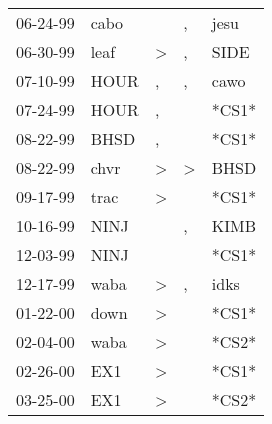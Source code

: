 \begin{supertabular}{p{0.07\textwidth}p{0.06\textwidth}p{0.02\textwidth}p{0.02\textwidth}p{0.06\textwidth}}
          06-24-99\textsuperscript{} &           cabo\textsuperscript{} &                  &                , &           jesu\textsuperscript{} \\
          06-30-99\textsuperscript{} &           leaf\textsuperscript{} &     \textgreater &                , &           SIDE\textsuperscript{} \\
          07-10-99\textsuperscript{} &           HOUR\textsuperscript{} &                , &                , &           cawo\textsuperscript{} \\
          07-24-99\textsuperscript{} &           HOUR\textsuperscript{} &                , &                  &                            *CS1* \\
          08-22-99\textsuperscript{} &           BHSD\textsuperscript{} &                , &                  &                            *CS1* \\
          08-22-99\textsuperscript{} &           chvr\textsuperscript{} &     \textgreater &     \textgreater &           BHSD\textsuperscript{} \\
          09-17-99\textsuperscript{} &           trac\textsuperscript{} &     \textgreater &                  &                            *CS1* \\
          10-16-99\textsuperscript{} &           NINJ\textsuperscript{} &                  &                , &           KIMB\textsuperscript{} \\
          12-03-99\textsuperscript{} &           NINJ\textsuperscript{} &                  &                  &                            *CS1* \\
          12-17-99\textsuperscript{} &           waba\textsuperscript{} &     \textgreater &                , &           idks\textsuperscript{} \\
          01-22-00\textsuperscript{} &           down\textsuperscript{} &     \textgreater &                  &                            *CS1* \\
          02-04-00\textsuperscript{} &           waba\textsuperscript{} &     \textgreater &                  &                            *CS2* \\
          02-26-00\textsuperscript{} &            EX1\textsuperscript{} &     \textgreater &                  &                            *CS1* \\
          03-25-00\textsuperscript{} &            EX1\textsuperscript{} &     \textgreater &                  &                            *CS2* \\

\end{supertabular}

